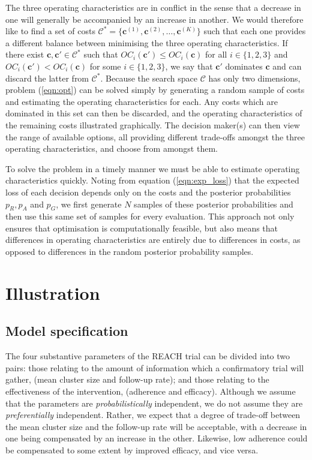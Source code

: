 \documentclass{article} %
\begin{document}
The three operating characteristics are in conflict in the sense that a decrease in one will generally be accompanied by an increase in another. We would therefore like to find a set of costs $\mathcal{C}^* = \{ \mathbf{c}^{(1)}, \mathbf{c}^{(2)}, \ldots, \mathbf{c}^{(K)} \}$ such that each one provides a different balance between minimising the three operating characteristics. If there exist $\mathbf{c}, \mathbf{c}' \in \mathcal{C}^*$ such that $OC_i(\mathbf{c}') \leq OC_i(\mathbf{c})$ for all $i \in \{1, 2, 3\}$ and $OC_i(\mathbf{c}') < OC_i(\mathbf{c})$ for some $i \in \{1, 2, 3\}$, we say that $\mathbf{c}'$ dominates $\mathbf{c}$ and can discard the latter from $\mathcal{C}^*$. Because the search space $\mathcal{C}$ has only two dimensions, problem (\ref{eqn:opt}) can be solved simply by generating a random sample of costs and estimating the operating characteristics for each. Any costs which are dominated in this set can then be discarded, and the operating characteristics of the remaining costs illustrated graphically. The decision maker(s) can then view the range of available options, all providing different trade-offs amongst the three operating characteristics, and choose from amongst them. 

To solve the problem in a timely manner we must be able to estimate operating characteristics quickly. Noting from equation (\ref{eqn:exp_loss}) that the expected loss of each decision depends only on the costs and the posterior probabilities $p_R, p_A$ and $p_G$, we first generate $N$ samples of these posterior probabilities and then use this same set of samples for every evaluation. This approach not only ensures that optimisation is computationally feasible, but also means that differences in operating characteristics are entirely due to differences in costs, as opposed to differences in the random posterior probability samples.

\section{Illustration}\label{sec:illustration}

\subsection{Model specification}

The four substantive parameters of the REACH trial can be divided into two pairs: those relating to the amount of information which a confirmatory trial will gather, (mean cluster size and follow-up rate); and those relating to the effectiveness of the intervention, (adherence and efficacy). Although we assume that the parameters are \emph{probabilistically} independent, we do not assume they are \emph{preferentially} independent. Rather, we expect that a degree of trade-off between  the mean cluster size and the follow-up rate will be acceptable, with a decrease in one being compensated by an increase in the other. Likewise, low adherence could be compensated to some extent by improved efficacy, and vice versa. 
\end{document}

